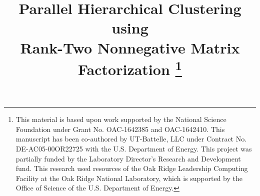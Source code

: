 \documentclass[conference,compsoc]{IEEEtran}
\begin{document}
\title{Parallel Hierarchical Clustering using \\ Rank-Two Nonnegative Matrix Factorization
\thanks{This material is based upon work supported by the National Science Foundation under Grant No. OAC-1642385 and OAC-1642410.
This manuscript has been co-authored by UT-Battelle, LLC under Contract No. DE-AC05-00OR22725 with the U.S. Department of
Energy. This project was partially funded by the Laboratory Director's Research and Development fund. This research used resources
of the Oak Ridge Leadership Computing Facility at the Oak Ridge National Laboratory, which is supported by the Office of Science of
the U.S. Department of Energy.}
}

\author{
\and
{}
\and
{}
}

\maketitle
















%



\end{document}
